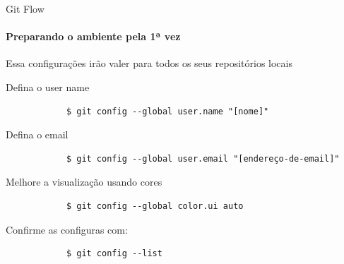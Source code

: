 \documentclass[xcolor=dvipsnames,t]{beamer}
\begin{document}
\begin{frame}[fragile]{Git Flow}
	\framesubtitle{Preparando o ambiente pela 1ª vez}
	Essa configurações irão valer para todos os seus repositórios locais
	\begin{block}{Defina o user name}		
		\begin{verbatim}
			$ git config --global user.name "[nome]"
		\end{verbatim}
	\end{block}
	
	\begin{block}{Defina o email}
		\begin{verbatim}
			$ git config --global user.email "[endereço-de-email]"
		\end{verbatim}
	\end{block}

	\begin{exampleblock}{Melhore a visualização usando cores}
		\begin{verbatim}
			$ git config --global color.ui auto
		\end{verbatim}
	\end{exampleblock}

	\begin{exampleblock}{Confirme as configuras com:}
		\begin{verbatim}
			$ git config --list
		\end{verbatim}
\end{exampleblock}

\end{frame}
\end{document}
